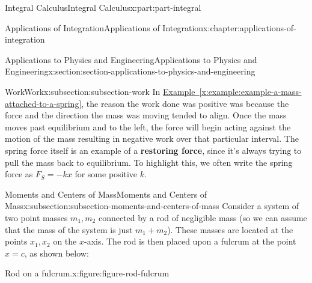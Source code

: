 \documentclass[twoside,10pt,]{tufte-book}
\newcommand{\xreffont}{\relax}
\newcommand{\terminology}[1]{\textbf{#1}}
\numberwithin{equation}{part}
\begin{document}
\begin{partptx}{Integral Calculus}{}{Integral Calculus}{}{}{x:part:part-integral}
\begin{chapterptx}{Applications of Integration}{}{Applications of Integration}{}{}{x:chapter:applications-of-integration}
\begin{sectionptx}{Applications to Physics and Engineering}{}{Applications to Physics and Engineering}{}{}{x:section:section-applications-to-physics-and-engineering}
\begin{subsectionptx}{Work}{}{Work}{}{}{x:subsection:subsection-work}
In \hyperref[x:example:example-a-mass-attached-to-a-spring]{Example~{\xreffont\ref{x:example:example-a-mass-attached-to-a-spring}}}, the reason the work done was positive was because the force and the direction the mass was moving tended to align. Once the mass moves past equilibrium and to the left, the force will begin acting against the motion of the mass resulting in negative work over that particular interval. The spring force itself is an example of a \terminology{restoring force}, since it's always trying to pull the mass back to equilibrium. To highlight this, we often write the spring force as \(F_{S} = -kx\) for some positive \(k\).%
\end{subsectionptx}
%
%
\typeout{************************************************}
\typeout{************************************************}
%
\begin{subsectionptx}{Moments and Centers of Mass}{}{Moments and Centers of Mass}{}{}{x:subsection:subsection-moments-and-centers-of-mass}
Consider a system of two point masses \(m_{1},m_{2}\) connected by a rod of negligible mass (so we can assume that the mass of the system is just \(m_{1}+m_{2}\)). These masses are located at the points \(x_{1},x_{2}\) on the \(x\)-axis. The rod is then placed upon a fulcrum at the point \(x=c\), as shown below:%
\begin{figureptx}{Rod on a fulcrum.}{x:figure:figure-rod-fulcrum}{}%
\begin{image}{0}{1}{0}%
\end{image}
\end{figureptx}
\end{subsectionptx}
\end{sectionptx}
\end{chapterptx}
\end{partptx}
\end{document}
